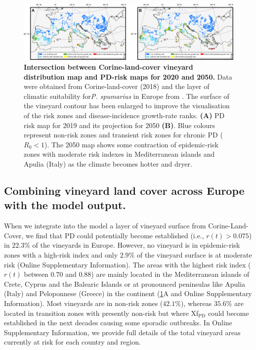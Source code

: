     \begin{figure}[H]
        \includegraphics[width=1\textwidth]{Figures/vineyards.png}
        \caption{\textbf{Intersection between Corine-land-cover vineyard
                distribution map and PD-risk maps for 2020 and 2050.}  Data
            were obtained from
            Corine-land-cover (2018) and the layer of climatic suitability
            for\textit{P.
                spumarius} in Europe from \cite{Godefroid2021}. The surface of
            the vineyard
            contour has been enlarged to improve the visualisation of the risk
            zones and
            disease-incidence growth-rate ranks. \textbf{(A)} PD risk map for
            2019 and its
            projection for 2050 \textbf{(B)}. Blue colours represent non-risk
            zones and
            transient risk zones for chronic PD ($R_0 < 1$). The 2050 map shows
            some
            contraction of epidemic-risk zones with moderate risk indexes in
            Mediterranean
            islands and Apulia (Italy) as the climate becomes hotter and
            dryer.}
        \label{fig6}
    \end{figure}

    \subsection{Combining vineyard land cover across Europe with the model
        output.}
    When we integrate into the model a layer of vineyard surface from
    Corine-Land-Cover, we find that PD could potentially become established
    (i.e.,
$r(t)>0.075$) in $22.3\%$ of the vineyards in Europe. However, no vineyard is
    in epidemic-risk zones with a high-risk index and only $2.9\%$ of the
    vineyard
    surface is at moderate risk (Online Supplementary Information). The areas
    with the
    highest
    risk
    index ($r(t)$ between $0.70$ and $0.88$) are mainly located in the
    Mediterranean islands of Crete, Cyprus and the Balearic Islands or at
    pronounced peninsulas like Apulia (Italy) and Peloponnese (Greece) in the
    continent (\cref{fig6}A and Online Supplementary Information).  Most
    vineyards are
    in
    non-risk
    zones ($42.1\%$), whereas $35.6\%$ are located in transition zones with
    presently non-risk but where Xf$_{\textrm{PD}}$ could become established in
    the
    next decades causing some sporadic outbreaks. In Online Supplementary
    Information,
    we provide full details of the total vineyard areas
    currently
    at risk for each country and region.


